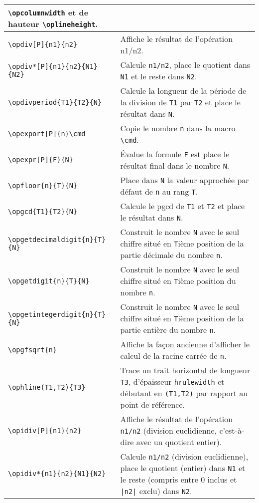 \documentclass[12pt]{report}
\begin{document}
\begin{longtable}{|l|p{6.3cm}|}
  \verb+\opcolumnwidth+ et de hauteur
  \verb+\oplineheight+. \\\hline
  \verb+\opdiv[P]{n1}{n2}+ &
  Affiche le résultat de l'opération n1/n2. \\\hline
  \verb+\opdiv*[P]{n1}{n2}{N1}{N2}+ &
  Calcule \verb+n1/n2+, place le quotient dans \verb+N1+ et
  le reste dans \verb+N2+. \\\hline
  \verb+\opdivperiod{T1}{T2}{N}+ &
  Calcule la longueur de la période de la division de \verb+T1+
  par \verb+T2+ et place le résultat dans \verb+N+. \\\hline
  \verb+\opexport[P]{n}\cmd+ &
  Copie le nombre \verb+n+ dans la macro \verb+\cmd+. \\\hline
  \verb+\opexpr[P]{F}{N}+ &
  Évalue la formule \texttt{F} est place le résultat final dans le
  nombre \texttt{N}. \\\hline
  \verb+\opfloor{n}{T}{N}+ &
  Place dans \verb+N+ la valeur approchée par défaut de
  \verb+n+ au rang \verb+T+. \\\hline
  \verb+\opgcd{T1}{T2}{N}+ &
  Calcule le pgcd de \verb+T1+ et \verb+T2+ et place le
  résultat dans \verb+N+. \\\hline
  \verb+\opgetdecimaldigit{n}{T}{N}+ &
  Construit le nombre \verb+N+ avec le seul chiffre situé en
  \verb+T+ième position de la partie décimale du nombre
  \verb+n+. \\\hline
  \verb+\opgetdigit{n}{T}{N}+ &
  Construit le nombre \verb+N+ avec le seul chiffre situé en
  \verb+T+ième position du nombre \verb+n+. \\\hline
  \verb+\opgetintegerdigit{n}{T}{N}+ &
  Construit le nombre \verb+N+ avec le seul chiffre situé en
  \verb+T+ième position de la partie entière du nombre
  \verb+n+. \\\hline
  \verb+\opgfsqrt{n}+ &
  Affiche la façon ancienne d'afficher le calcul de la racine
  carrée de \verb+n+. \\\hline
  \verb+\ophline(T1,T2){T3}+ &
  Trace un trait horizontal de longueur \verb+T3+, d'épaisseur
  \verb+hrulewidth+ et débutant en \verb+(T1,T2)+ par
  rapport au point de référence. \\\hline
  \verb+\opidiv[P]{n1}{n2}+ &
  Affiche le résultat de l'opération \verb+n1/n2+ (division
  euclidienne,   c'est-à-dire avec un quotient entier). \\\hline
  \verb+\opidiv*{n1}{n2}{N1}{N2}+ &
  Calcule \verb+n1/n2+ (division euclidienne), place le quotient
  (entier) dans \verb+N1+ et le reste (compris entre 0 inclus et
  \verb+|n2|+ exclu) dans \verb+N2+. \\\hline

\end{longtable}
\end{document}
